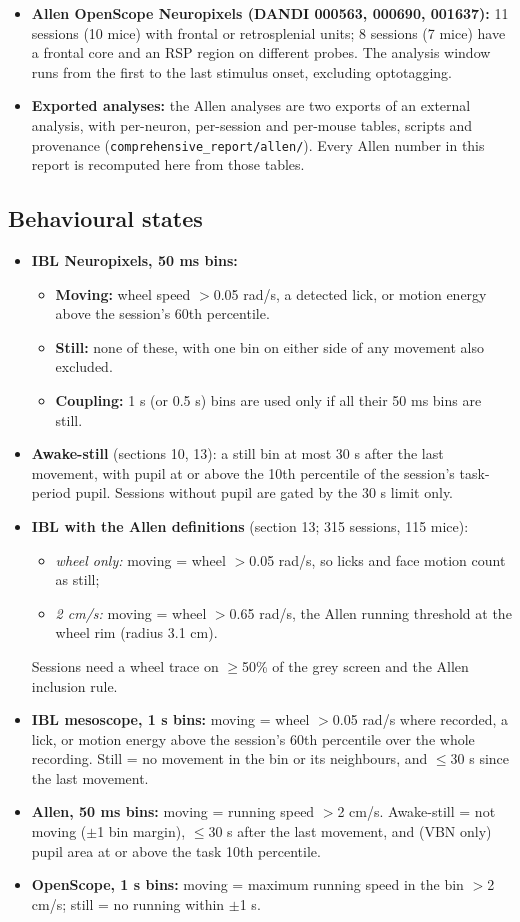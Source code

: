 \documentclass[10pt,a4paper]{article}
\begin{document}
\begin{itemize}
\begin{itemize}
\end{itemize}
\item \textbf{Allen OpenScope Neuropixels (DANDI 000563, 000690, 001637):} 11 sessions (10 mice) with frontal or retrosplenial units; 8 sessions (7 mice) have a frontal core and an RSP region on different probes. The analysis window runs from the first to the last stimulus onset, excluding optotagging.
\item \textbf{Exported analyses:} the Allen analyses are two exports of an external analysis, with per-neuron, per-session and per-mouse tables, scripts and provenance (\texttt{comprehensive\_\allowbreak{}report/\allowbreak{}allen/\allowbreak{}}). Every Allen number in this report is recomputed here from those tables.
\end{itemize}
\subsection{Behavioural states}
\begin{itemize}
\item \textbf{IBL Neuropixels, 50 ms bins:} 
\begin{itemize}
\item \textbf{Moving:} wheel speed $>$0.05 rad/s, a detected lick, or motion energy above the session's 60th percentile.
\item \textbf{Still:} none of these, with one bin on either side of any movement also excluded.
\item \textbf{Coupling:} 1 s (or 0.5 s) bins are used only if all their 50 ms bins are still.
\end{itemize}
\item \textbf{Awake-still} (sections 10, 13): a still bin at most 30 s after the last movement, with pupil at or above the 10th percentile of the session's task-period pupil. Sessions without pupil are gated by the 30 s limit only.
\item \textbf{IBL with the Allen definitions} (section 13; 315 sessions, 115 mice): 
\begin{itemize}
\item \emph{wheel only:} moving = wheel $>$0.05 rad/s, so licks and face motion count as still;
\item \emph{2 cm/s:} moving = wheel $>$0.65 rad/s, the Allen running threshold at the wheel rim (radius 3.1 cm).
\end{itemize}
 Sessions need a wheel trace on $\geq$50\% of the grey screen and the Allen inclusion rule.
\item \textbf{IBL mesoscope, 1 s bins:} moving = wheel $>$0.05 rad/s where recorded, a lick, or motion energy above the session's 60th percentile over the whole recording. Still = no movement in the bin or its neighbours, and $\leq$30 s since the last movement.
\item \textbf{Allen, 50 ms bins:} moving = running speed $>$2 cm/s. Awake-still = not moving ($\pm$1 bin margin), $\leq$30 s after the last movement, and (VBN only) pupil area at or above the task 10th percentile.
\item \textbf{OpenScope, 1 s bins:} moving = maximum running speed in the bin $>$2 cm/s; still = no running within $\pm$1 s.
\end{itemize}
\end{document}
